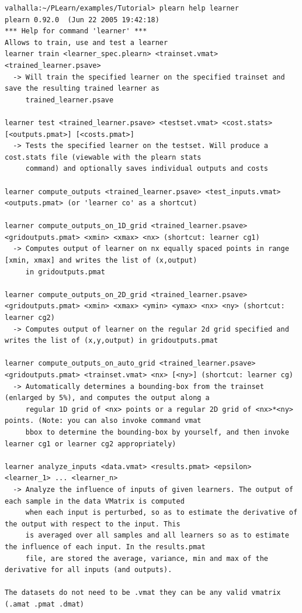 \documentclass[11pt]{book}
\begin{document}
\begin{verbatim}
valhalla:~/PLearn/examples/Tutorial> plearn help learner
plearn 0.92.0  (Jun 22 2005 19:42:18)
*** Help for command 'learner' ***
Allows to train, use and test a learner
learner train <learner_spec.plearn> <trainset.vmat> <trained_learner.psave>
  -> Will train the specified learner on the specified trainset and save the resulting trained learner as
     trained_learner.psave

learner test <trained_learner.psave> <testset.vmat> <cost.stats> [<outputs.pmat>] [<costs.pmat>]
  -> Tests the specified learner on the testset. Will produce a cost.stats file (viewable with the plearn stats
     command) and optionally saves individual outputs and costs

learner compute_outputs <trained_learner.psave> <test_inputs.vmat> <outputs.pmat> (or 'learner co' as a shortcut)

learner compute_outputs_on_1D_grid <trained_learner.psave> <gridoutputs.pmat> <xmin> <xmax> <nx> (shortcut: learner cg1)
  -> Computes output of learner on nx equally spaced points in range [xmin, xmax] and writes the list of (x,output)
     in gridoutputs.pmat

learner compute_outputs_on_2D_grid <trained_learner.psave> <gridoutputs.pmat> <xmin> <xmax> <ymin> <ymax> <nx> <ny> (shortcut: learner cg2)
  -> Computes output of learner on the regular 2d grid specified and writes the list of (x,y,output) in gridoutputs.pmat

learner compute_outputs_on_auto_grid <trained_learner.psave> <gridoutputs.pmat> <trainset.vmat> <nx> [<ny>] (shortcut: learner cg)
  -> Automatically determines a bounding-box from the trainset (enlarged by 5%), and computes the output along a
     regular 1D grid of <nx> points or a regular 2D grid of <nx>*<ny> points. (Note: you can also invoke command vmat
     bbox to determine the bounding-box by yourself, and then invoke learner cg1 or learner cg2 appropriately)

learner analyze_inputs <data.vmat> <results.pmat> <epsilon> <learner_1> ... <learner_n>
  -> Analyze the influence of inputs of given learners. The output of each sample in the data VMatrix is computed
     when each input is perturbed, so as to estimate the derivative of the output with respect to the input. This
     is averaged over all samples and all learners so as to estimate the influence of each input. In the results.pmat
     file, are stored the average, variance, min and max of the derivative for all inputs (and outputs).

The datasets do not need to be .vmat they can be any valid vmatrix (.amat .pmat .dmat)
\end{verbatim}
\end{document}
